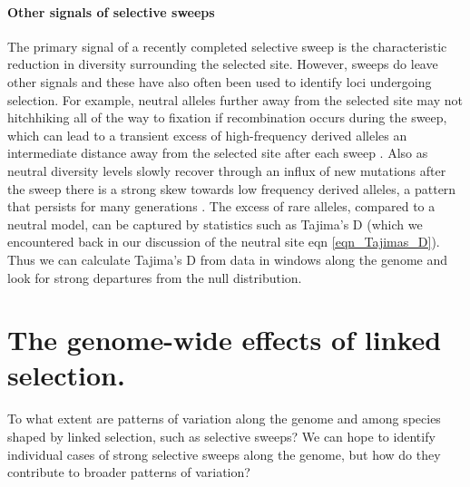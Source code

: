 \paragraph{Other signals of selective sweeps}
The primary signal of a recently completed selective sweep is the
characteristic reduction in diversity surrounding the selected site.
However, sweeps do leave other signals and these have also often been
used to identify loci undergoing selection. 
For example, neutral alleles further away from the selected site may not
hitchhiking all of the way to fixation if recombination occurs during
the sweep, which can lead to a transient excess of high-frequency
derived alleles an intermediate distance away from the selected site
after each sweep \citep{Fay:00,Przeworski:02,Kim:06}.
Also as neutral diversity levels slowly recover through an influx of
new mutations after the sweep there is a strong skew towards low
frequency derived alleles, a pattern that persists for many
generations \citep{Braverman:95, Przeworski:02,Kim:06}. The excess of
rare alleles, compared to a neutral model, can be captured by statistics such as Tajima's D (which
we encountered back in our discussion of the neutral site eqn
\ref{eqn_Tajimas_D}). Thus we can calculate Tajima's D from data in
windows along the genome and look for
strong departures from the null distribution. 

  
\section{The genome-wide effects of linked selection.}


To what extent are patterns of variation along the genome and
  among species shaped by linked selection, such as selective sweeps? 
We can hope to identify individual cases of strong selective sweeps
along the genome, but how do they contribute to broader patterns of
variation?

